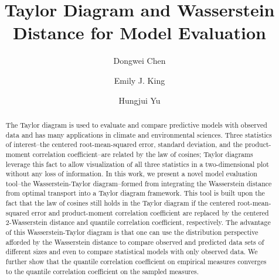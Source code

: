 \documentclass{amsart}
\numberwithin{equation}{section}
\theoremstyle{plain}
\theoremstyle{definition}
\begin{document}
%
\title[Taylor Diagram and Wasserstein Distance]{Taylor Diagram and Wasserstein Distance for Model Evaluation}

\author{Dongwei Chen}
\address{Department of Mathematics and Statistical Science, University of Idaho, Moscow, ID, USA, 83844}

\author{Emily J. King}
\address{Department of Mathematics, Colorado State University, Fort Collins, CO, USA, 80523}

\author{Hungjui Yu}
\address{Cooperative Institute for Research in the Atmosphere, Colorado State University, Fort Collins, CO, USA, 80523; Department of Atmospheric Science, Colorado State University, Fort Collins, CO, USA, 80523}



\begin{abstract}
 The Taylor diagram is used to evaluate and compare predictive models with observed data and has many applications in climate and environmental sciences. 
 Three statistics of interest--the centered root-mean-squared error, standard deviation, and the product-moment correlation coefficient--are related by the law of cosines; Taylor diagrams leverage this fact to allow visualization of all three statistics in a two-dimensional plot without any loss of information.
 In this work, we present a novel model evaluation tool--the Wasserstein-Taylor diagram--formed from integrating the Wasserstein distance from optimal transport into a Taylor diagram framework.
 This tool is built upon the fact that the law of cosines still holds in the Taylor diagram if the centered root-mean-squared error and  product-moment correlation coefficient are replaced by the centered 2-Wasserstein distance and quantile correlation coefficient, respectively. 
 The advantage of this Wasserstein-Taylor diagram is that one can use the distribution perspective afforded by the Wasserstein distance to compare observed and predicted data sets of different sizes and even to compare statistical models with only observed data. 
 We further show that the quantile correlation coefficient on empirical measures converges to the quantile correlation coefficient on the sampled measures.
\end{abstract}

\end{document}
